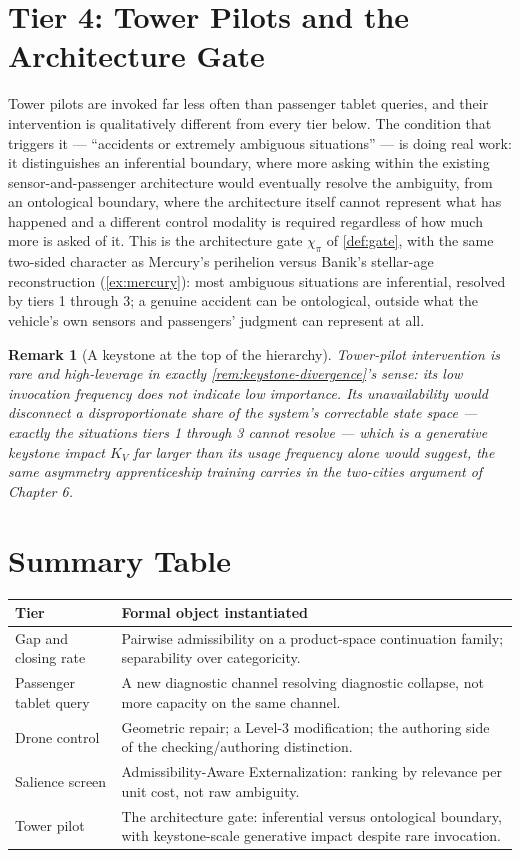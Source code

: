 \documentclass[12pt]{report}
\newtheorem{remark}[definition]{Remark}
\begin{document}
\section*{Tier 4: Tower Pilots and the Architecture Gate}

Tower pilots are invoked far less often than passenger tablet queries,
and their intervention is qualitatively different from every tier below.
The condition that triggers it --- ``accidents or extremely ambiguous
situations'' --- is doing real work: it distinguishes an inferential
boundary, where more asking within the existing sensor-and-passenger
architecture would eventually resolve the ambiguity, from an ontological
boundary, where the architecture itself cannot represent what has
happened and a different control modality is required regardless of how
much more is asked of it. This is the architecture gate
$\chi_\pi$ of \cref{def:gate}, with the same two-sided character as
Mercury's perihelion versus Banik's stellar-age reconstruction
(\cref{ex:mercury}): most ambiguous situations are inferential,
resolved by tiers 1 through 3; a genuine accident can be ontological,
outside what the vehicle's own sensors and passengers' judgment can
represent at all.

\begin{remark}[A keystone at the top of the hierarchy]
Tower-pilot intervention is rare and high-leverage in exactly
\cref{rem:keystone-divergence}'s sense: its low invocation frequency
does not indicate low importance. Its unavailability would disconnect a
disproportionate share of the system's correctable state space ---
exactly the situations tiers 1 through 3 cannot resolve --- which is a
generative keystone impact $K_V$ far larger than its usage frequency
alone would suggest, the same asymmetry apprenticeship training carries
in the two-cities argument of Chapter 6.
\end{remark}

\section*{Summary Table}

\begin{center}
\begin{tabular}{lp{3.6in}}
\hline
Tier & Formal object instantiated \\
\hline
Gap and closing rate & Pairwise admissibility on a product-space
continuation family; separability over categoricity. \\
Passenger tablet query & A new diagnostic channel resolving diagnostic
collapse, not more capacity on the same channel. \\
Drone control & Geometric repair; a Level-3 modification; the authoring
side of the checking/authoring distinction. \\
Salience screen & Admissibility-Aware Externalization: ranking by
relevance per unit cost, not raw ambiguity. \\
Tower pilot & The architecture gate: inferential versus ontological
boundary, with keystone-scale generative impact despite rare
invocation. \\
\hline
\end{tabular}
\end{center}
\end{document}
